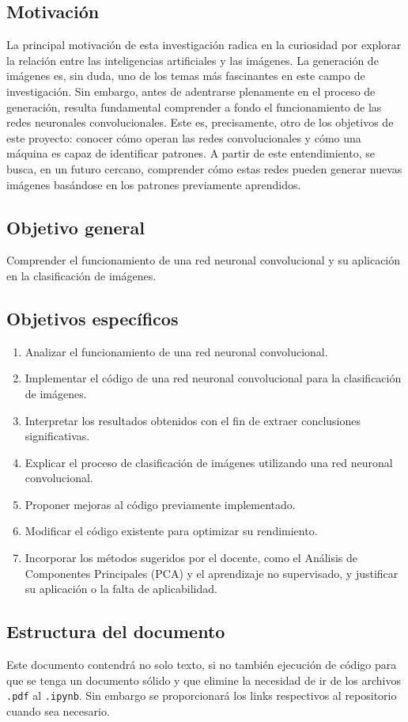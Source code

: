 \documentclass[../main.tex]{subfiles}
\begin{document}
\subsection{Motivación}

La principal motivación de esta investigación radica en la curiosidad por explorar la relación entre las inteligencias artificiales y las imágenes. La generación de imágenes es, sin duda, uno de los temas más fascinantes en este campo de investigación. Sin embargo, antes de adentrarse plenamente en el proceso de generación, resulta fundamental comprender a fondo el funcionamiento de las redes neuronales convolucionales. Este es, precisamente, otro de los objetivos de este proyecto: conocer cómo operan las redes convolucionales y cómo una máquina es capaz de identificar patrones. A partir de este entendimiento, se busca, en un futuro cercano, comprender cómo estas redes pueden generar nuevas imágenes basándose en los patrones previamente aprendidos.

\subsection{Objetivo general}

Comprender el funcionamiento de una red neuronal convolucional y su aplicación en la clasificación de imágenes.

\subsection{Objetivos específicos}

\begin{enumerate}
    \item Analizar el funcionamiento de una red neuronal convolucional.
    \item Implementar el código de una red neuronal convolucional para la clasificación de imágenes.
    \item Interpretar los resultados obtenidos con el fin de extraer conclusiones significativas.
    \item Explicar el proceso de clasificación de imágenes utilizando una red neuronal convolucional. \item Proponer mejoras al código previamente implementado.
    \item Modificar el código existente para optimizar su rendimiento.
    \item Incorporar los métodos sugeridos por el docente, como el Análisis de Componentes Principales (PCA) y el aprendizaje no supervisado, y justificar su aplicación o la falta de aplicabilidad.
\end{enumerate}

\subsection{Estructura del documento}

Este documento contendrá no solo texto, si no también ejecución de código para que se tenga un documento sólido y que elimine la necesidad de ir de los archivos \texttt{.pdf} al \texttt{.ipynb}. Sin embargo se proporcionará los links respectivos al repositorio cuando sea necesario.
\end{document}
